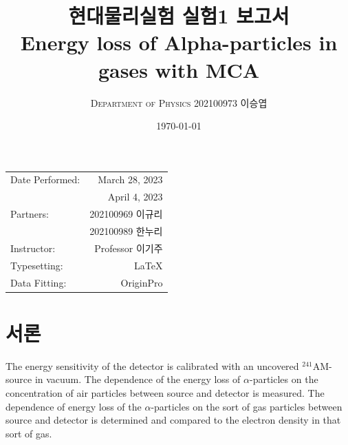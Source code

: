 \documentclass[a4paper, 10pt, nanum]{CSUniSchoolLabReport}
\title{현대물리실험 실험1 보고서 \\ Energy loss of Alpha-particles in gases with MCA} %
\author{\textsc{Department of Physics} 202100973 이승엽}
\date{\today}
\begin{document}
\maketitle %

\begin{center}
	\begin{tabular}{l r}
		Date Performed: & March 28, 2023 \\ %
		& April 4, 2023 \\
		Partners: & 202100969 이규리 \\ %
		& 202100989 한누리 \\
		Instructor: & Professor 이기주 \\ %
		Typesetting: & LaTeX \\
		Data Fitting: & OriginPro
	\end{tabular}
\end{center}


\maketitle


\section{서론}

	The energy sensitivity of the detector is calibrated with an uncovered $^{241}\textrm{AM}$-source in vacuum. The dependence of the energy loss of $\alpha$-particles on the concentration of air particles between source and detector is measured. The dependence of energy loss of the $\alpha$-particles on the sort of gas particles between source and detector is determined and compared to the electron density in that sort of gas.
\end{document}
